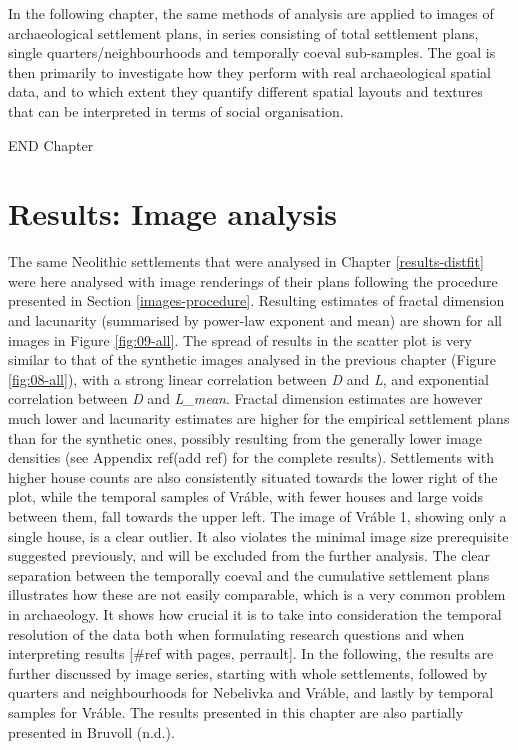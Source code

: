 \documentclass[
  12pt,
]{book}
\begin{document}
In the following chapter, the same methods of analysis are applied to images of archaeological settlement plans, in series consisting of total settlement plans, single quarters/neighbourhoods and temporally coeval sub-samples. The goal is then primarily to investigate how they perform with real archaeological spatial data, and to which extent they quantify different spatial layouts and textures that can be interpreted in terms of social organisation.

END Chapter

\hypertarget{images-results}{%
\chapter{Results: Image analysis}\label{images-results}}

The same Neolithic settlements that were analysed in Chapter \ref{results-distfit} were here analysed with image renderings of their plans following the procedure presented in Section \ref{images-procedure}. Resulting estimates of fractal dimension and lacunarity (summarised by power-law exponent and mean) are shown for all images in Figure \ref{fig:09-all}. The spread of results in the scatter plot is very similar to that of the synthetic images analysed in the previous chapter (Figure \ref{fig:08-all}), with a strong linear correlation between \emph{D} and \emph{L}, and exponential correlation between \emph{D} and \emph{L\_mean}. Fractal dimension estimates are however much lower and lacunarity estimates are higher for the empirical settlement plans than for the synthetic ones, possibly resulting from the generally lower image densities (see Appendix ref(add ref) for the complete results). Settlements with higher house counts are also consistently situated towards the lower right of the plot, while the temporal samples of Vráble, with fewer houses and large voids between them, fall towards the upper left. The image of Vráble 1, showing only a single house, is a clear outlier. It also violates the minimal image size prerequisite suggested previously, and will be excluded from the further analysis. The clear separation between the temporally coeval and the cumulative settlement plans illustrates how these are not easily comparable, which is a very common problem in archaeology. It shows how crucial it is to take into consideration the temporal resolution of the data both when formulating research questions and when interpreting results {[}\#ref with pages, perrault{]}. In the following, the results are further discussed by image series, starting with whole settlements, followed by quarters and neighbourhoods for Nebelivka and Vráble, and lastly by temporal samples for Vráble. The results presented in this chapter are also partially presented in Bruvoll (n.d.).
\end{document}
